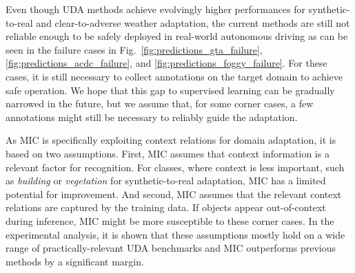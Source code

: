 \documentclass[10pt,twocolumn,letterpaper]{article}
\begin{document}
Even though UDA methods achieve evolvingly higher performances for synthetic-to-real and clear-to-adverse weather adaptation, the current methods are still not reliable enough to be safely deployed in real-world autonomous driving as can be seen in the failure cases in Fig.~\ref{fig:predictions_gta_failure}, \ref{fig:predictions_acdc_failure}, and \ref{fig:predictions_foggy_failure}. For these cases, it is still necessary to collect annotations on the target domain to achieve safe operation. We hope that this gap to supervised learning can be gradually narrowed in the future, but we assume that, for some corner cases, a few annotations might still be necessary to reliably guide the adaptation.

As MIC is specifically exploiting context relations for domain adaptation, it is based on two assumptions. First, MIC assumes that context information is a relevant factor for recognition. For classes, where context is less important, such as \emph{building} or \emph{vegetation} for synthetic-to-real adaptation, MIC has a limited potential for improvement. And second, MIC assumes that the relevant context relations are captured by the training data. If objects appear out-of-context during inference, MIC might be more susceptible to these corner cases. 
In the experimental analysis, it is shown that these assumptions mostly hold on a wide range of practically-relevant UDA benchmarks and MIC outperforms previous methods by a significant margin.


 
\end{document}
